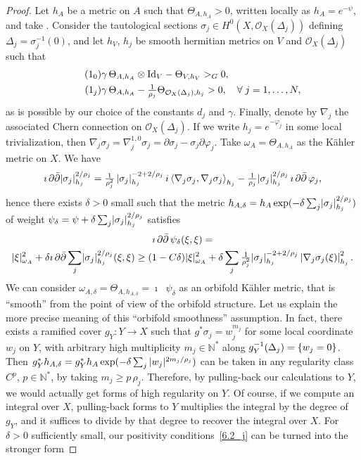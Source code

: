 \documentclass[AHL,Unicode,longabstracts,published]{cedram}
\DeclareMathOperator{\ddbar}{\partial\bar\partial}
\DeclarePairedDelimiter{\abs}{\lvert}{\rvert}
\newcommand*\Id{\mathrm{Id}}
\newcommand*\cO{\mathcal{O}}
\newcommand*\bN{\mathbb{N}}
\let\geq\geqslant
\let\oldforall\forall
\renewcommand*{\forall}{\mathrel{\oldforall}}
\begin{document}
\begin{proof}
Let $h_A$ be a metric on $A$ such that $\Theta_{A,h_A}>0$, written locally as $h_A=e^{-\psi}$, and take
. Consider the tautological sections
$\sigma_j\in H^0(X,\cO_X(\Delta_j))$ defining $\Delta_j=\sigma_j^{-1}(0)$, and let $h_V$, $h_j$ be smooth hermitian metrics on
$V$ and $\cO_X(\Delta_j)$ such that
\begin{align}
\stepcounter{equation}
\tag{$\theequation_0$} &
\gamma\,\Theta_{A,h_A}\otimes\Id_V-\Theta_{V,h_V}>_G0,
\\
\tag{$\theequation_j$}\label{6.2_j}
&
\gamma\,\Theta_{A,h_A}-\tfrac{1}{\rho_j}\Theta_{\cO_X(\Delta_j),h_j}>0,\quad
\forall j=1,\dotsc,N,
\end{align}
as is possible by our choice of the constants $d_j$ and $\gamma$. Finally, denote by $\nabla_j$ the associated Chern connection on
$\cO_X(\Delta_j)$. If we write $h_j=e^{-\varphi_j}$ in some local trivialization, then $\nabla_j\sigma_j=\nabla_j^{1,0}\sigma_j=
\partial\sigma_j-\sigma_j\partial\varphi_j$. Take $\omega_A=\Theta_{A,h_A}$ as the K\"ahler metric on $X$. We have
\[
\imath\ddbar\abs{\sigma_j}_{h_j}^{2/\rho_j}=
\tfrac{1}{\rho_j^2}\,\abs{\sigma_j}_{h_j}^{-2+2/\rho_j}\, i\left\langle\nabla_j\sigma_j,\nabla_j\sigma_j\right\rangle_{h_j} -\tfrac{1}{\rho_j}\abs{\sigma_j}_{h_j}^{2/\rho_j}\,\imath\ddbar\varphi_j,
\]
hence there exists $\delta>0$ small such that the metric
$h_{A,\delta}=h_A\exp(-\delta\sum_j\abs{\sigma_j}_{h_j}^{2/\rho_j})$ of weight $\psi_\delta=\psi+\delta\sum_j\abs{\sigma_j}_{h_j}^{2/\rho_j}$ satisfies
\begin{multline*}
\imath\ddbar\psi_\delta(\xi,\xi) =
\\
\abs{\xi}^2_{\omega_A} +
\delta\imath\ddbar
\sum_j\abs{\sigma_j}_{h_j}^{2/\rho_j}(\xi,\xi)
\ge (1-C\delta)\abs{\xi}^2_{\omega_A} +
\delta\sum_j\tfrac{1}{\rho_j^2}\abs{\sigma_j}_{h_j}^{-2+2/\rho_j}
\left|\nabla_j\sigma_j(\xi)\right|_{h_j}^2.
\end{multline*}
We can consider $\omega_{A,\delta}=\Theta_{A,h_{A,\delta}}=\imath\ddbar\psi_\delta$ as an orbifold K\"ahler metric, that is ``smooth'' from the point of view of the orbifold structure. Let us explain the more precise meaning of this ``orbifold smoothness'' assumption. In fact, there exists a ramified cover $g_Y\colon Y\to X$ such that $g^*\sigma_j=w_j^{m_j}$ for some local coordinate $w_j$ on $Y$, with arbitrary high multiplicity $m_j\in\bN^*$ along $\smash{g_Y^{-1}}(\Delta_j)=\{w_j=0\}$. Then $g_Y^*h_{A,\delta}=g_Y^*h_A\exp(-\delta\sum_j \smash{\abs{w_j}^{2m_j/\rho_j})}$ can be taken in any regularity class $C^p$, $p\in \bN^*$, by taking $m_j\geq p\,\rho_j$. Therefore, by pulling-back our calculations to $Y$, we would actually get forms of high regularity on $Y$. Of course, if we compute an integral over $X$, pulling-back forms to $Y$ multiplies the integral by the degree of $g_Y$, and it suffices to divide by that degree to recover the integral over $X$. For $\delta>0$ sufficiently small, our positivity conditions~\eqref{6.2_j} can be turned into the stronger form

\end{proof}
\end{document}
